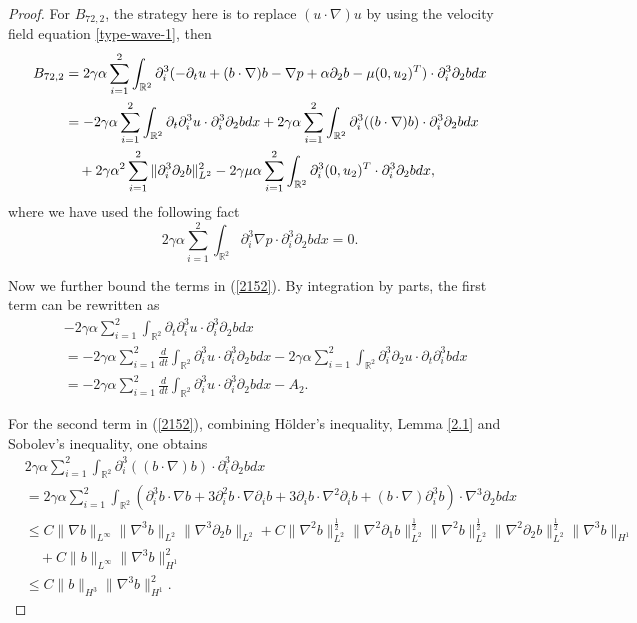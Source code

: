 \documentclass[reqno,11pt]{amsart}
\def\R{\mathbb R}
\numberwithin{Thm}{section}
\begin{document}
\begin{proof}
For $B_{72,2}$, the strategy here is to replace $(u\cdot\nabla) u$ by using the velocity field equation \eqref{type-wave-1}, then
\begin{align}\label{2152}
B_{72,2}
&=2\gamma\alpha\sum_{i=1}^2\int_{\R^2}\partial_i^3(-\partial_tu+(b\cdot\nabla) b-\nabla p+\alpha\partial_2b -\mu (0,u_2)^{T})\cdot\partial_i^3\partial_2 bdx\notag\\
&=-2\gamma\alpha\sum_{i=1}^2\int_{\R^2}\partial_t\partial_i^3u\cdot\partial_i^3\partial_2 bdx+2\gamma\alpha\sum_{i=1}^2\int_{\R^2}\partial_i^3((b\cdot\nabla) b )\cdot\partial_i^3\partial_2 bdx\notag\\
&\quad+2\gamma\alpha^2\sum_{i=1}^2\|\partial_i^3\partial_2 b\|_{L^2}^2-2\gamma\mu\alpha\sum_{i=1}^2\int_{\R^2}\partial_i^3 (0,u_2)^{T}\cdot\partial_i^3\partial_2 bdx,
\end{align}
where we have used the following fact $$2\gamma\alpha\sum_{i=1}^2\int_{\R^2}\partial_i^3\nabla p\cdot\partial_i^3\partial_2 bdx=0.$$
\par
Now we further bound the terms in (\ref{2152}).  By integration by parts, the first term can be rewritten as
\begin{align*}
&-2\gamma\alpha\sum_{i=1}^2\int_{\R^2}\partial_t\partial_i^3u\cdot\partial_i^3\partial_2 bdx\nonumber\\
&=-2\gamma\alpha\sum_{i=1}^2\frac{d}{dt}\int_{\R^2}\partial_i^3u\cdot\partial_i^3 \partial_2bdx-2\gamma\alpha\sum_{i=1}^2\int_{\R^2}\partial_i^3\partial_2u\cdot\partial_t \partial_i^3bdx\nonumber\\
&=-2\gamma\alpha\sum_{i=1}^2\frac{d}{dt}\int_{\R^2}\partial_i^3u\cdot\partial_i^3 \partial_2bdx-A_{2}.
\end{align*}


For the second term in (\ref{2152}), combining H\"{o}lder's inequality, Lemma \ref{2.1} and Sobolev's inequality, one obtains
 \begin{align*}
&2\gamma\alpha\sum_{i=1}^2\int_{\R^2}\partial_i^3((b\cdot\nabla) b )\cdot\partial_i^3\partial_2 bdx\nonumber\\
&=2\gamma\alpha\sum_{i=1}^2\int_{\R^2}\left(\partial_i^3b\cdot\nabla b+3\partial_i^2b\cdot\nabla\partial_i b +3\partial_i b\cdot\nabla^2\partial_i b+(b\cdot\nabla)\partial_i^3 b \right)\cdot\nabla^3\partial_2 bdx\nonumber\\
&\leq C\|\nabla b\|_{L^{\infty}}\|\nabla^3 b\|_{L^2}\|\nabla^3\partial_2 b\|_{L^2}+C\|\nabla^2 b\|_{L^{2}}^{\frac{1}{2}}\|\nabla^2\partial_1b\|_{L^{2}}^{\frac{1}{2}}\|\nabla^2b\|_{L^{2}}^{\frac{1}{2}}\| \nabla^2\partial_2b\|_{L^{2}}^{\frac{1}{2}}\|\nabla^3b\|_{H^{1}}\nonumber\\
&\quad+ C\|b\|_{L^{\infty}}\|\nabla^3 b\|_{H^1}^2\nonumber\\
&\leq  C\|b\|_{H^{3}}\|\nabla^3 b\|_{H^1}^2.
\end{align*}




\end{proof}
\end{document}
